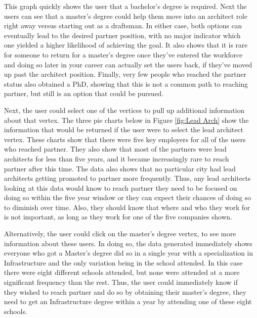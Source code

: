 This graph quickly shows the user that a bachelor's degree is required.  Next
the users can see that a master's degree could help them move into an architect
role right away versus starting out as a draftsman.  In either case, both
options can eventually lead to the desired partner position, with no major
indicator which one yielded a higher likelihood of achieving the goal.  It also
shows that it is rare for someone to return for a master's degree once they've
entered the workforce and doing so later in your career can actually set the
users back, if they've moved up past the architect position.  Finally, very
few people who reached the partner status also obtained a PhD, showing that this
is not a common path to reaching partner, but still is an option that could be
pursued.

Next, the user could select one of the vertices to pull up additional
information about that vertex.  The three pie charts below in Figure \ref{fig:Lead Arch} show
the information that would be returned if the user were to select the lead
architect vertex.  These charts show that there were five key employers for all of
the users who reached partner.  They also show that most of the partners were
lead architects for less than five years, and it became increasingly rare to
reach partner after this time.  The data also shows that no particular city had
lead architects getting promoted to partner more frequently.  Thus, any lead
architects looking at this data would know to reach partner they need to be
focused on doing so within the five year window or they can expect their chances
of doing so to diminish over time.  Also, they should know that where and who
they work for is not important, as long as they work for one of the five
companies shown.

Alternatively, the user could click on the master's degree vertex, to see more
information about these users.  In doing so, the data generated immediately
shows everyone who got a Master's degree did so in a single year with a
specialization in Infrastructure and the only variation being in the school
attended.  In this case there were eight different schools attended, but none
were attended at a more significant frequency than the rest.  Thus, the user
could immediately know if they wished to reach partner and do so by obtaining their
master's degree, they need to get an Infrastructure degree within a year by
attending one of these eight schools.


